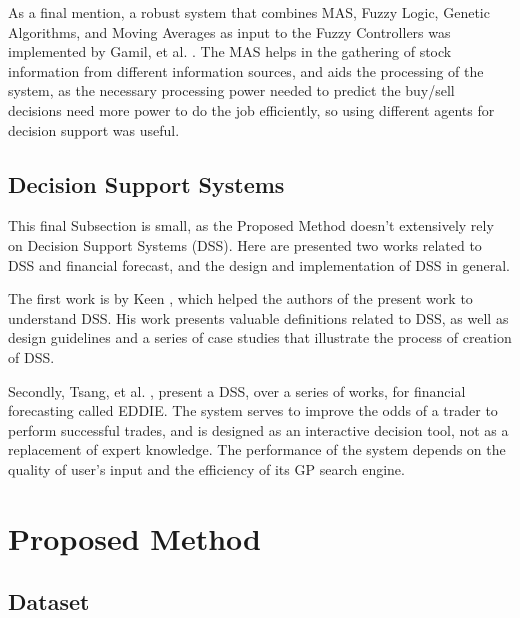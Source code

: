 \documentclass[12pt,journal,draftcls,onecolumn]{IEEEtran}
\begin{document}
As a final mention, a robust system that combines MAS, Fuzzy Logic, Genetic Algorithms, and Moving Averages as input to the Fuzzy Controllers was implemented by Gamil, et al. \cite{Gamil2007}. The MAS helps in the gathering of stock information from different information sources, and aids the processing of the system, as the necessary processing power needed to predict the buy/sell decisions need more power to do the job efficiently, so using different agents for decision support was useful.

\subsection{Decision Support Systems}
\label{decision-support-systems}

This final Subsection is small, as the Proposed Method doesn't extensively rely on Decision Support Systems (DSS). Here are presented two works related to DSS and financial forecast, and the design and implementation of DSS in general.

The first work is by Keen \cite{keen1980decision}, which helped the authors of the present work to understand DSS. His work presents valuable definitions related to DSS, as well as design guidelines and a series of case studies that illustrate the process of creation of DSS.

Secondly, Tsang, et al. \cite{tsang1998eddie} \cite{tsang2000eddie} \cite{Tsang2004}  \cite{Tsang2008}, present a DSS, over a series of works, for financial forecasting called EDDIE. The system serves to improve the odds of a trader to perform successful trades, and is designed as an interactive decision tool, not as a replacement of expert knowledge. The performance of the system depends on the quality of user's input and the efficiency of its GP search engine.

\section{Proposed Method}
\label{proposed-method}

\subsection{Dataset}
\label{dataset}
\end{document}

